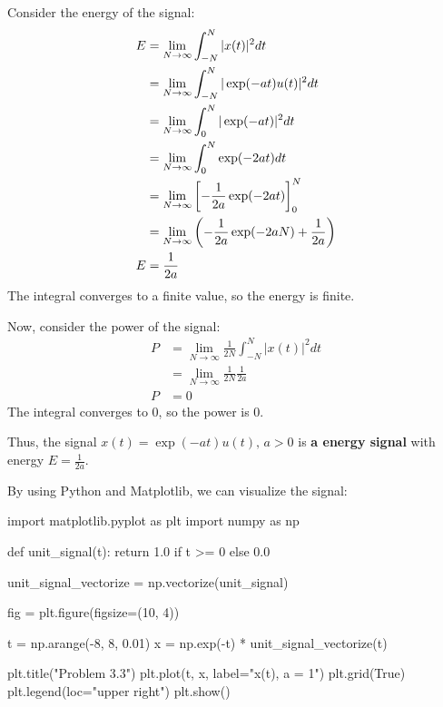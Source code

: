 \documentclass[a4paper, 10pt]{article}
\begin{document}
\begin{solution}
Consider the energy of the signal:
\begin{align*}
    E &= \lim_{N \to \infty} \int_{-N}^{N} |x(t)|^2 dt \\
    &= \lim_{N \to \infty} \int_{-N}^{N} |\exp(-at)u(t)|^2 dt \\
    &= \lim_{N \to \infty} \int_{0}^{N} |\exp(-at)|^2 dt \\
    &= \lim_{N \to \infty} \int_{0}^{N} \exp(-2at) dt \\
    &= \lim_{N \to \infty} \left[ -\frac{1}{2a} \exp(-2at) \right]_{0}^{N} \\
    &= \lim_{N \to \infty} \left( -\frac{1}{2a} \exp(-2aN) + \frac{1}{2a} \right) \\
    E &= \frac{1}{2a}
\end{align*}
The integral converges to a finite value, so the energy is finite.

\vspace{5mm}

Now, consider the power of the signal:
\begin{align*}
    P &= \lim_{N \to \infty} \frac{1}{2N} \int_{-N}^{N} |x(t)|^2 dt \\
    &= \lim_{N \to \infty} \frac{1}{2N} \frac{1}{2a} \\
    P &= 0
\end{align*}
The integral converges to 0, so the power is 0.

\vspace{2mm}

Thus, the signal \( x(t) = \exp(-at)u(t), \,  a > 0 \) is \textbf{a energy signal} with energy \( E = \frac{1}{2a} \).

\vspace{2mm}

By using Python and Matplotlib, we can visualize the signal:
\begin{codingbox}
import matplotlib.pyplot as plt
import numpy as np

def unit_signal(t):
    return 1.0 if t >= 0 else 0.0

unit_signal_vectorize = np.vectorize(unit_signal)

fig = plt.figure(figsize=(10, 4))

t = np.arange(-8, 8, 0.01)
x = np.exp(-t) * unit_signal_vectorize(t)

plt.title("Problem 3.3")
plt.plot(t, x, label="x(t), a = 1")
plt.grid(True)
plt.legend(loc="upper right")
plt.show()
\end{codingbox}


\end{solution}
\end{document}
